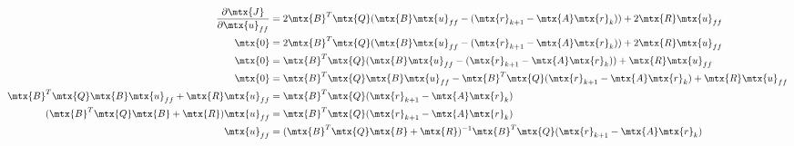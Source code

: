 \begin{align*}
  \frac{\partial\mtx{J}}{\partial\mtx{u}_{ff}} &= 2\mtx{B}^T\mtx{Q}
    (\mtx{B}\mtx{u}_{ff} - (\mtx{r}_{k+1} - \mtx{A}\mtx{r}_k)) +
    2\mtx{R}\mtx{u}_{ff} \\
  \mtx{0} &= 2\mtx{B}^T\mtx{Q}
    (\mtx{B}\mtx{u}_{ff} - (\mtx{r}_{k+1} - \mtx{A}\mtx{r}_k)) +
    2\mtx{R}\mtx{u}_{ff} \\
  \mtx{0} &= \mtx{B}^T\mtx{Q}
    (\mtx{B}\mtx{u}_{ff} - (\mtx{r}_{k+1} - \mtx{A}\mtx{r}_k)) +
    \mtx{R}\mtx{u}_{ff} \\
  \mtx{0} &= \mtx{B}^T\mtx{Q}\mtx{B}\mtx{u}_{ff} -
    \mtx{B}^T\mtx{Q}(\mtx{r}_{k+1} - \mtx{A}\mtx{r}_k) + \mtx{R}\mtx{u}_{ff} \\
  \mtx{B}^T\mtx{Q}\mtx{B}\mtx{u}_{ff} + \mtx{R}\mtx{u}_{ff} &=
    \mtx{B}^T\mtx{Q}(\mtx{r}_{k+1} - \mtx{A}\mtx{r}_k) \\
  (\mtx{B}^T\mtx{Q}\mtx{B} + \mtx{R})\mtx{u}_{ff} &=
    \mtx{B}^T\mtx{Q}(\mtx{r}_{k+1} - \mtx{A}\mtx{r}_k) \\
  \mtx{u}_{ff} &= (\mtx{B}^T\mtx{Q}\mtx{B} + \mtx{R})^{-1}
    \mtx{B}^T\mtx{Q}(\mtx{r}_{k+1} - \mtx{A}\mtx{r}_k)
\end{align*}


